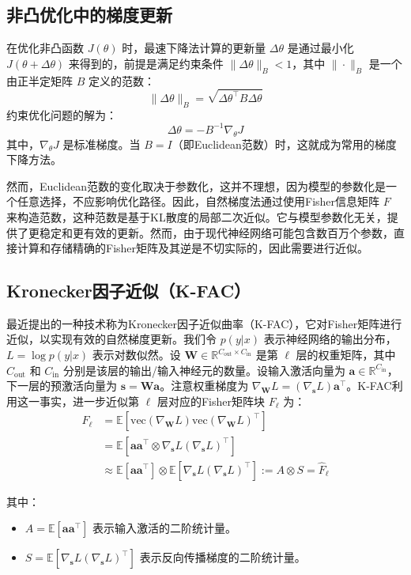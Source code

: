\documentclass[twocolumn, 10pt]{article} %
\theoremstyle{remark}
\begin{document}
\subsection{非凸优化中的梯度更新}
在优化非凸函数 \( J(\theta) \) 时，最速下降法计算的更新量 \(\Delta \theta\) 是通过最小化 \( J(\theta + \Delta \theta) \) 来得到的，前提是满足约束条件 \(\|\Delta \theta\|_B < 1\)，其中 \(\|\cdot\|_B\) 是一个由正半定矩阵 \(B\) 定义的范数：
\[
\|\Delta \theta\|_B = \sqrt{\Delta \theta^\top B \Delta \theta}
\]
约束优化问题的解为：
\[
\Delta \theta = -B^{-1} \nabla_\theta J
\]
其中，\(\nabla_\theta J\) 是标准梯度。当 \(B = I\)（即Euclidean范数）时，这就成为常用的梯度下降方法。

然而，Euclidean范数的变化取决于参数化，这并不理想，因为模型的参数化是一个任意选择，不应影响优化路径。因此，自然梯度法通过使用Fisher信息矩阵 \(F\) 来构造范数，这种范数是基于KL散度的局部二次近似。它与模型参数化无关，提供了更稳定和更有效的更新。然而，由于现代神经网络可能包含数百万个参数，直接计算和存储精确的Fisher矩阵及其逆是不切实际的，因此需要进行近似。

\subsection{Kronecker因子近似（K-FAC）}
最近提出的一种技术称为Kronecker因子近似曲率（K-FAC），它对Fisher矩阵进行近似，以实现有效的自然梯度更新。我们令 \(p(y|x)\) 表示神经网络的输出分布，\(L = \log p(y|x)\) 表示对数似然。设 \(\mathbf{W} \in \mathbb{R}^{C_{\text{out}} \times C_{\text{in}}}\) 是第 \(\ell\) 层的权重矩阵，其中 \(C_{\text{out}}\) 和 \(C_{\text{in}}\) 分别是该层的输出/输入神经元的数量。设输入激活向量为 \(\mathbf{a} \in \mathbb{R}^{C_{\text{in}}}\)，下一层的预激活向量为 \(\mathbf{s} = \mathbf{W}\mathbf{a}\)。注意权重梯度为 \(\nabla_{\mathbf{W}} L = (\nabla_{\mathbf{s}} L) \mathbf{a}^\top\)。K-FAC利用这一事实，进一步近似第 \(\ell\) 层对应的Fisher矩阵块 \(F_\ell\) 为：
\[
\begin{aligned}
    F_\ell &= \mathbb{E}[\text{vec}(\nabla_{\mathbf{W}} L)\text{vec}(\nabla_{\mathbf{W}} L)^\top] \\
    &= \mathbb{E}[\mathbf{a}\mathbf{a}^\top \otimes \nabla_{\mathbf{s}} L (\nabla_{\mathbf{s}} L)^\top] \\
    &\approx \mathbb{E}[\mathbf{a}\mathbf{a}^\top] \otimes \mathbb{E}[\nabla_{\mathbf{s}} L (\nabla_{\mathbf{s}} L)^\top] := A \otimes S = \hat{F}_\ell
\end{aligned}
\]

其中：
\begin{itemize}
    \item \(A = \mathbb{E}[\mathbf{a}\mathbf{a}^\top]\) 表示输入激活的二阶统计量。
    \item \(S = \mathbb{E}[\nabla_{\mathbf{s}} L (\nabla_{\mathbf{s}} L)^\top]\) 表示反向传播梯度的二阶统计量。
\end{itemize}
\end{document}
